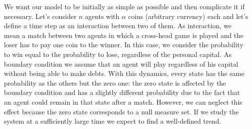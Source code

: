 We want our model to be initially as simple as possible and then complicate it if necessary.
Let's consider $n$ agents with $\alpha$ coins (arbitrary currency) each and let's define a time step as an interaction between two of them.
As interaction, we mean a match between two agents in which a cross-head game is played and the loser has to pay one coin to the winner.
In this case, we consider the probability to win equal to the probability to lose, regardless of the personal capital.
As boundary condition we assume that an agent will play regardless of his capital without being able to make debts. 
With this dynamics, every state has the same probability as the others but the zero one: the zero state is affected by the boundary condition and has a slightly different probability due to the fact that an agent could remain in that state after a match.
However, we can neglect this effect because the zero state corresponds to a null measure set.
If we study the system at a sufficiently large time we expect to find a well-defined trend.

